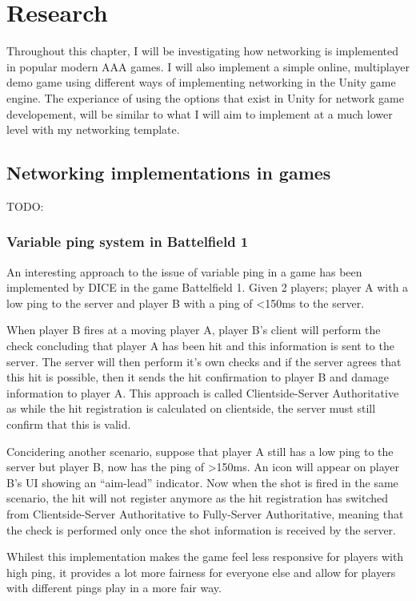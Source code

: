 \chapter{Research}
Throughout this chapter, I will be investigating how networking is implemented in popular modern AAA games. I will also implement a simple online, multiplayer demo game using different ways of implementing networking in the Unity game engine. The experiance of using the options that exist in Unity for network game developement, will be similar to what I will aim to implement at a much lower level with my networking template.

\section{Networking implementations in games}
TODO:

\subsection{Variable ping system in Battelfield 1}
An interesting approach to the issue of variable ping in a game has been implemented by DICE in the game Battelfield 1. Given 2 players; player A with a low ping to the server and player B with a ping of <150ms to the server.

When player B fires at a moving player A, player B's client will perform the check concluding that player A has been hit and this information is sent to the server. The server will then perform it's own checks and if the server agrees that this hit is possible, then it sends the hit confirmation to player B and damage information to player A. This approach is called Clientside-Server Authoritative as while the hit registration is calculated on clientside, the server must still confirm that this is valid.

Concidering another scenario, suppose that player A still has a low ping to the server but player B, now has the ping of >150ms. An icon will appear on player B's UI showing an ``aim-lead'' indicator. Now when the shot is fired in the same scenario, the hit will not register anymore as the hit registration has switched from Clientside-Server Authoritative to Fully-Server Authoritative, meaning that the check is performed only once the shot information is received by the server.

Whilest this implementation makes the game feel less responsive for players with high ping, it provides a lot more fairness for everyone else and allow for players with different pings play in a more fair way.



